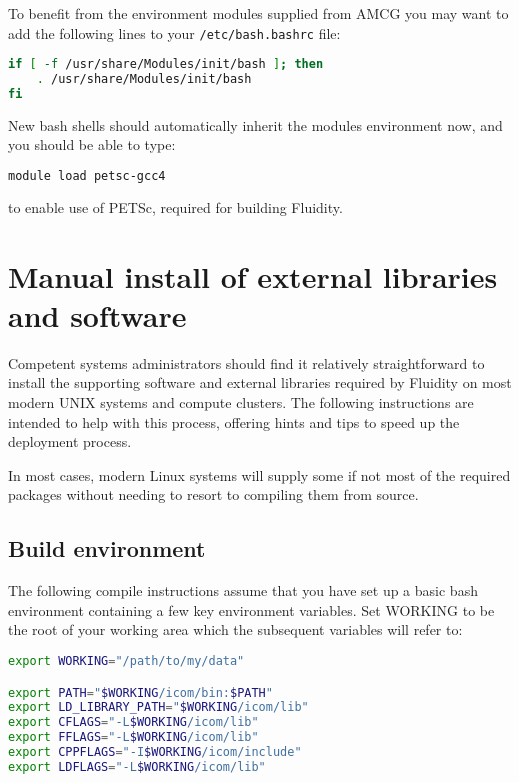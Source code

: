 To benefit from the environment modules supplied from AMCG you may want to add
the following lines to your \lstinline[language=bash]+/etc/bash.bashrc+ file:

\begin{lstlisting}[language=bash]
if [ -f /usr/share/Modules/init/bash ]; then
    . /usr/share/Modules/init/bash
fi
\end{lstlisting}

New bash shells should automatically inherit the modules environment now, and
you should be able to type:

\begin{lstlisting}[language=bash]
module load petsc-gcc4
\end{lstlisting}

to enable use of PETSc, required for building Fluidity.
 
\section{Manual install of external libraries and software}
\label{sec:required_ḻibraries_manual_install}

Competent systems administrators should find it relatively straightforward to
install the supporting software and external libraries required by Fluidity on
most modern UNIX systems and compute clusters. The following instructions are
intended to help with this process, offering hints and tips to speed up the
deployment process.

In most cases, modern Linux systems will supply some if not most of the
required packages without needing to resort to compiling them from source.

\subsection{Build environment}
\label{sec:required_libraries_build_environment}

The following compile instructions assume that you have set up a basic bash
environment containing a few key environment variables. Set WORKING to be the
root of your working area which the subsequent variables will refer to:

\begin{lstlisting}[language=bash]
export WORKING="/path/to/my/data"

export PATH="$WORKING/icom/bin:$PATH"
export LD_LIBRARY_PATH="$WORKING/icom/lib"
export CFLAGS="-L$WORKING/icom/lib"
export FFLAGS="-L$WORKING/icom/lib"
export CPPFLAGS="-I$WORKING/icom/include"
export LDFLAGS="-L$WORKING/icom/lib"
\end{lstlisting}


